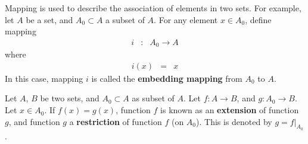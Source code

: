 Mapping is used to describe the association of elements in two sets. For example, let $A$ be a set, and $A_0 \subset A$ a subset of $A$. For any element $x\in A_0$, define mapping
\begin{eqnarray}
  i &:& A_0 \rightarrow A \nonumber
\end{eqnarray}
where
\begin{eqnarray}
  i(x) &=& x \nonumber
\end{eqnarray}
In this case, mapping $i$ is called the \textbf{embedding mapping} from $A_0$ to $A$.

Let $A$, $B$ be two sets, and $A_0 \subset A$ as subset of $A$. Let $f: A\rightarrow B$, and $g: A_0\rightarrow B$. Let $x\in A_0$. If $f(x)=g(x)$, function $f$ is known as an \textbf{extension} of function $g$, and function $g$ a \textbf{restriction} of function $f$ (on $A_0$). This is denoted by $g=f|_{A_0}$.















